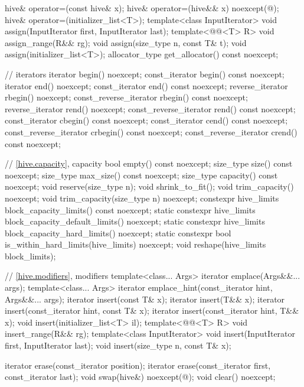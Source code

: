 \begin{codeblock}
{{    hive& operator=(const hive& x);
    hive& operator=(hive&& x) noexcept(@\seebelow@);
    hive& operator=(initializer_list<T>);
    template<class InputIterator>
      void assign(InputIterator first, InputIterator last);
    template<@@<T> R>
      void assign_range(R&& rg);
    void assign(size_type n, const T& t);
    void assign(initializer_list<T>);
    allocator_type get_allocator() const noexcept;

    // iterators
    iterator               begin() noexcept;
    const_iterator         begin() const noexcept;
    iterator               end() noexcept;
    const_iterator         end() const noexcept;
    reverse_iterator       rbegin() noexcept;
    const_reverse_iterator rbegin() const noexcept;
    reverse_iterator       rend() noexcept;
    const_reverse_iterator rend() const noexcept;
    const_iterator         cbegin() const noexcept;
    const_iterator         cend() const noexcept;
    const_reverse_iterator crbegin() const noexcept;
    const_reverse_iterator crend() const noexcept;

    // \ref{hive.capacity}, capacity
    bool empty() const noexcept;
    size_type size() const noexcept;
    size_type max_size() const noexcept;
    size_type capacity() const noexcept;
    void reserve(size_type n);
    void shrink_to_fit();
    void trim_capacity() noexcept;
    void trim_capacity(size_type n) noexcept;
    constexpr hive_limits block_capacity_limits() const noexcept;
    static constexpr hive_limits block_capacity_default_limits() noexcept;
    static constexpr hive_limits block_capacity_hard_limits() noexcept;
    static constexpr bool is_within_hard_limits(hive_limits) noexcept;
    void reshape(hive_limits block_limits);

    // \ref{hive.modifiers}, modifiers
    template<class... Args> iterator emplace(Args&&... args);
    template<class... Args> iterator emplace_hint(const_iterator hint, Args&&... args);
    iterator insert(const T& x);
    iterator insert(T&& x);
    iterator insert(const_iterator hint, const T& x);
    iterator insert(const_iterator hint, T&& x);
    void insert(initializer_list<T> il);
    template<@@<T> R>
      void insert_range(R&& rg);
    template<class InputIterator>
      void insert(InputIterator first, InputIterator last);
    void insert(size_type n, const T& x);

    iterator erase(const_iterator position);
    iterator erase(const_iterator first, const_iterator last);
    void swap(hive&) noexcept(@\seebelow@);
    void clear() noexcept;

}}
\end{codeblock}
